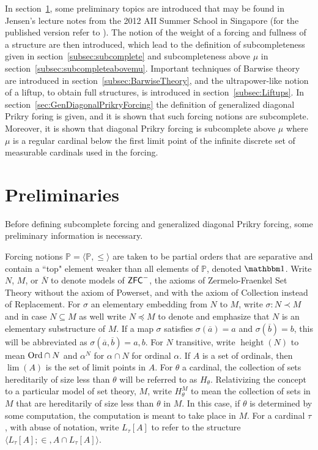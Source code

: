 \documentclass{amsart}
\theoremstyle{definition}
\theoremstyle{remark}
\renewcommand{\P}{\mathbb{P}}
\newcommand{\N}{{\overline{N}}}
\newcommand{\ZFC}{\textup{\ensuremath{\textsf{ZFC}}}}
\newcommand{\Ord}{\textup{\ensuremath{\text{Ord}}}}
\DeclareMathOperator{\height}{height}
\begin{document}
In section~\ref{sec:preliminaries}, some preliminary topics are introduced that may be found in Jensen's lecture notes from the 2012 AII Summer School in Singapore (for the published version refer to \cite{Jensen:2012fr}). The notion of the weight of a forcing and fullness of a structure are then introduced, which lead to the definition of subcompleteness given in section~\ref{subsec:subcomplete} and subcompleteness above $\mu$ in section~\ref{subsec:subcompleteabovemu}. Important techniques of Barwise theory are introduced in section~\ref{subsec:BarwiseTheory}, and the ultrapower-like notion of a liftup, to obtain full structures, is introduced in section~\ref{subsec:Liftups}. In section~\ref{sec:GenDiagonalPrikryForcing} the definition of generalized diagonal Prikry foring is given, and it is shown that such forcing notions are subcomplete. Moreover, it is shown that diagonal Prikry forcing is subcomplete above $\mu$ where $\mu$ is a regular cardinal below the first limit point of the infinite discrete set of measurable cardinals used in the forcing.

\section{Preliminaries} \label{sec:preliminaries}
Before defining subcomplete forcing and generalized diagonal Prikry forcing, some preliminary information is necessary.

Forcing notions $\P = \langle \P, \leq \rangle$ are taken to be partial orders that are separative and contain a ``top" element weaker than all elements of $\P$, denoted $\mathbbm 1$.
Write $N$, $M$, or $\N$ to denote models of $\ZFC^-$, the axioms of Zermelo-Fraenkel Set Theory without the axiom of \textsf{Powerset}, and with the axiom of \textsf{Collection} instead of \textsf{Replacement}. For $\sigma$ an elementary embedding from $N$ to $M$, write $\sigma: N \prec M$ and in case $N \subseteq M$ as well write $N \preccurlyeq M$ to denote and emphasize that $N$ is an elementary substructure of $M$. 
If a map $\sigma$ satisfies $\sigma(\overline a)=a$ and $\sigma(\overline b)=b$, this will be abbreviated as $\sigma(\overline a,\overline b)=a,b$.
For $N$ transitive, write $\height(N)$ to mean $\Ord \cap N$ and $\alpha^N$ for $\alpha \cap N$ for ordinal $\alpha$.
If $A$ is a set of ordinals, then $\lim(A)$ is the set of limit points in $A$.  
For $\theta$ a cardinal, the collection of sets hereditarily of size less than $\theta$ will be referred to as $H_\theta$. Relativizing the concept to a particular model of set theory, $M$, write $H_\theta^M$ to mean the collection of sets in $M$ that are hereditarily of size less than $\theta$ in $M$. In this case, if $\theta$ is determined by some computation, the computation is meant to take place in $M$.
For a cardinal $\tau$, with abuse of notation, write $L_\tau[A]$ to refer to the structure $\langle L_\tau[A]; \in, A \cap L_\tau[A] \rangle$. 
\end{document}
